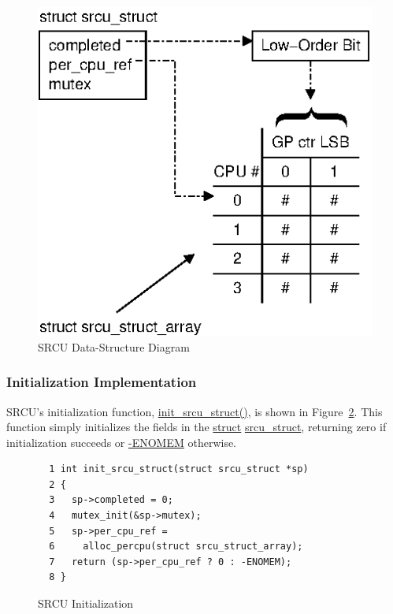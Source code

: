 \begin{figure}[htb]
\begin{center}
\includegraphics{appendix/rcuimpl/srcuds}
\end{center}
\caption{SRCU Data-Structure Diagram}
\label{fig:app:whymb:SRCU Data-Structure Diagram}
\end{figure}

\subsubsection{Initialization Implementation}
\label{sec:app:rcuimpl:Initialization Implementation}

SRCU's initialization function, \url{init_srcu_struct()}, is shown in
Figure~\ref{fig:app:rcuimpl:SRCU Initialization}.
This function simply initializes the fields in the
\url{struct} \url{srcu_struct}, returning zero if initialization succeeds
or \url{-ENOMEM} otherwise.

\begin{figure}[htbp]
{ \scriptsize
\begin{verbatim}
  1 int init_srcu_struct(struct srcu_struct *sp)
  2 {
  3   sp->completed = 0;
  4   mutex_init(&sp->mutex);
  5   sp->per_cpu_ref =
  6     alloc_percpu(struct srcu_struct_array);
  7   return (sp->per_cpu_ref ? 0 : -ENOMEM);
  8 }
\end{verbatim}
}
\caption{SRCU Initialization}
\label{fig:app:rcuimpl:SRCU Initialization}
\end{figure}

